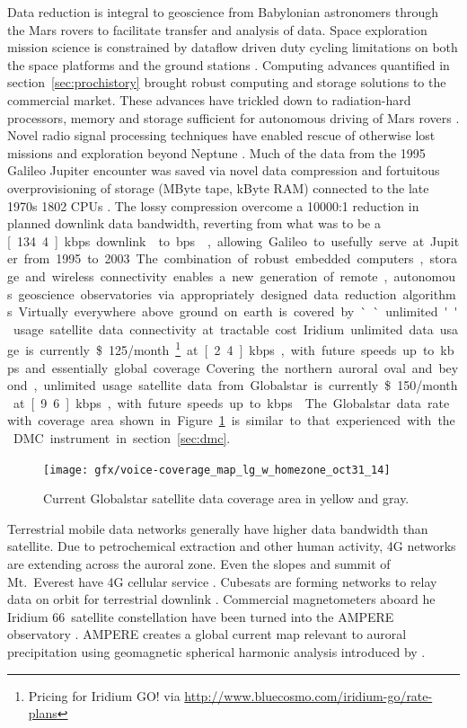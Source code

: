 Data reduction is integral to geoscience from  Babylonian astronomers through the Mars rovers to facilitate transfer and analysis of data.
Space exploration mission science is constrained by dataflow driven duty cycling limitations on both the space platforms \citep{kurth1979} and the ground stations \citep{deutsch1982}.
Computing advances quantified in section~\ref{sec:prochistory} brought robust computing and storage solutions to the commercial market.
These advances have trickled down to radiation-hard processors, memory and storage sufficient for autonomous driving of Mars rovers \citep{woods2014}.
Novel radio signal processing techniques have enabled rescue of otherwise lost missions and exploration beyond Neptune \citep{deboy2004,haskins2007}.
Much of the data from the 1995 Galileo Jupiter encounter was saved via novel data compression \citep{cheung1996} and fortuitous overprovisioning of storage (\unit[110]{MByte} tape, \unit[192]{kByte} RAM) \citep{marr1994} connected to the late 1970s 1802 CPUs \citep{thomas1980}. 
The lossy compression overcome a 10000:1 reduction in planned downlink data bandwidth, reverting from what was to be a \unit[134.4]{kbps} downlink \citep{layland1990} to \unit[16]{bps} \citep{beyer1996}, allowing Galileo to usefully serve at Jupiter from 1995 to 2003.
The combination of robust embedded computers, storage and wireless connectivity enables a new generation of remote, autonomous geoscience observatories via appropriately designed data reduction algorithms.

Virtually everywhere above ground on earth is covered by ``unlimited'' usage satellite data connectivity at tractable cost.
Iridium unlimited data usage is currently \$125/month\footnote{Pricing for Iridium GO! via \url{http://www.bluecosmo.com/iridium-go/rate-plans}} at \unit[2.4]{kbps}, with future speeds up to \unit[128]{kbps} and essentially global coverage.
Covering the northern auroral oval and beyond, unlimited usage satellite data from Globalstar is currently \$150/month at \unit[9.6]{kbps}, with future speeds up to \unit[256]{kbps} \citep{globalstar2015}.
The Globalstar data rate with coverage area shown in Figure~\ref{fig:globalstar} is similar to that experienced with the DMC instrument in section~\ref{sec:dmc}.
\begin{figure}
    \texttt{[image: gfx/voice-coverage\_map\_lg\_w\_homezone\_oct31\_14]}
    \caption{Current Globalstar satellite data coverage area in yellow and gray.}\label{fig:globalstar}
\end{figure}
Terrestrial mobile data networks generally have higher data bandwidth than satellite.
Due to petrochemical extraction and other human activity, 4G networks are extending across the auroral zone.
Even the slopes and summit of Mt.\ Everest have 4G cellular service \citep{oberhaus2016}. 
Cubesats are forming networks to relay data on orbit for terrestrial downlink \citep{parham2016}.
Commercial magnetometers aboard he Iridium 66~satellite constellation have been turned into the AMPERE observatory \citep{waters2001}.
AMPERE creates a global current map relevant to auroral precipitation using geomagnetic spherical harmonic analysis introduced by \citet{gauss1839}.

